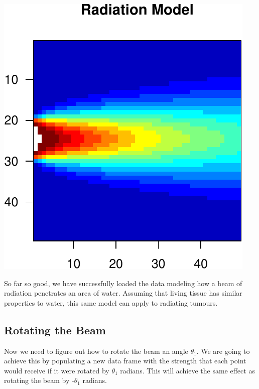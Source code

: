 \documentclass[]{article}
\begin{document}
\begin{center}\includegraphics{TumourSurvival_files/figure-latex/unnamed-chunk-1-1} \end{center}

So far so good, we have successfully loaded the data modeling how a beam
of radiation penetrates an area of water. Assuming that living tissue
has similar properties to water, this same model can apply to radiating
tumours.

\subsection{Rotating the Beam}\label{rotating-the-beam}

Now we need to figure out how to rotate the beam an angle \(\theta_1\).
We are going to achieve this by populating a new data frame with the
strength that each point would receive if it were rotated by
\(\theta_1\) radians. This will achieve the same effect as rotating the
beam by -\(\theta_1\) radians.
\end{document}
